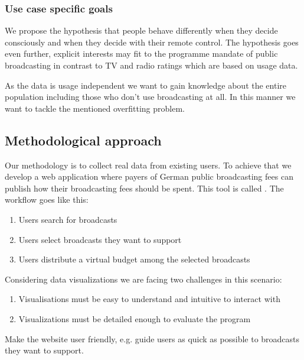 \documentclass{article}
\begin{document}
\subsubsection{Use case specific goals}
We propose the hypothesis that people behave differently when they decide consciously and when they decide with their remote control.
The hypothesis goes even further, explicit interests may fit to the programme mandate of public broadcasting in contrast to TV and radio ratings which are based on usage data.

As the data is usage independent we want to gain knowledge about the entire population including those who don't use broadcasting at all.
In this manner we want to tackle the mentioned overfitting problem.

\subsection{Methodological approach}
Our methodology is to collect real data from existing users.
To achieve that we develop a web application where payers of German public broadcasting fees can publish how their broadcasting fees should be spent.
This tool is called \rufu{}.
The workflow goes like this:
\begin{enumerate}
\item Users search for broadcasts
\item Users select broadcasts they want to support
\item Users distribute a virtual budget among the selected broadcasts
\end{enumerate}

Considering data visualizations we are facing two challenges in this scenario:
\begin{enumerate}
\item
Visualisations must be easy to understand and intuitive to interact with
\item
Visualizations must be detailed enough to evaluate the program
\end{enumerate}

Make the website user friendly, e.g. guide users as quick as possible to broadcasts they want to support.
\end{document}
